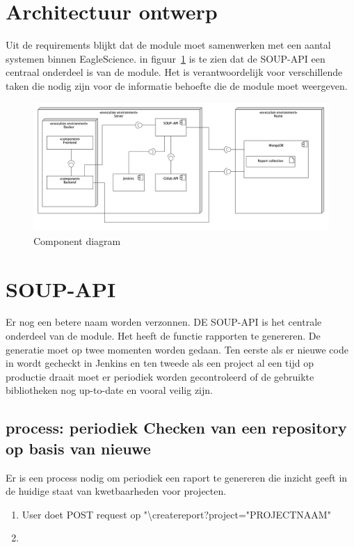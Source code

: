 \section{Architectuur ontwerp}\label{sec:architectuur-ontwerp}
Uit de requirements blijkt dat de module moet samenwerken met een aantal systemen binnen EagleScience. in figuur~\ref{fig:UML-ComponentDiagram} is te zien dat de SOUP-API een centraal onderdeel is van de module. Het is verantwoordelijk voor verschillende taken die nodig zijn voor de informatie behoefte die de module moet weergeven.

\begin{figure}[bth]
    \myfloatalign
    \includegraphics[width=15cm]{gfx/UMLcomponent diagram}
    \caption{Component diagram}
    \label{fig:UML-ComponentDiagram}
\end{figure}


\section{SOUP-API}\label{sec:soup-api}
Er  nog een betere naam worden verzonnen.
DE SOUP-API is het centrale onderdeel van de module. Het heeft de functie rapporten te genereren. De generatie moet op twee momenten worden gedaan. Ten eerste als er nieuwe code in wordt gecheckt in Jenkins en ten tweede als een project al een tijd op productie draait moet er periodiek worden gecontroleerd of de gebruikte bibliotheken nog up-to-date en vooral veilig zijn.

\subsection{process: periodiek Checken van een repository op basis van nieuwe }\label{subsec:process:-periodiek-checken}
Er is een process nodig om periodiek een raport te genereren die inzicht geeft in de huidige staat van kwetbaarheden voor projecten.

\begin{enumerate}
    \item User doet POST request op "\textbackslash createreport?project="PROJECTNAAM"
    \item
\end{enumerate}


